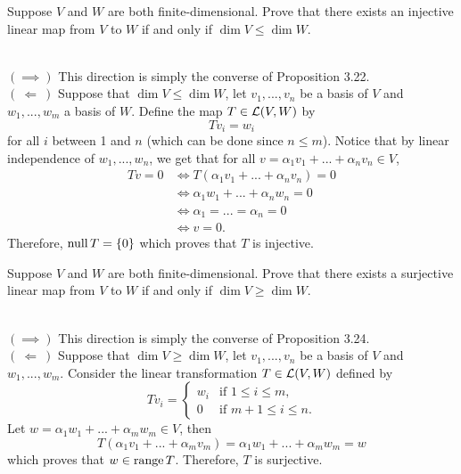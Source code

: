 \begin{exercise}
    Suppose $V$ and $W$ are both finite-dimensional. Prove that there exists an injective linear map from $V$ to $W$ if and only if $\dim V \leq \dim W$. \\
\end{exercise}

\begin{solution}
    \\ $(\implies)$ This direction is simply the converse of Proposition 3.22.\\
    $( \ \Longleftarrow \ )$ Suppose that $\dim V \leq \dim W$, let $v_1, ..., v_n$ be a basis of $V$ and $w_1, ..., w_m$ a basis of $W$. Define the map $T \in \mathcal{L}(V,W)$ by 
    $$Tv_i = w_i$$
    for all $i$ between 1 and $n$ (which can be done since $n \leq m$). Notice that by linear independence of $w_1, ..., w_n$, we get that for all $v = \alpha_1v_1 + ... + \alpha_n v_n \in V$,
    \begin{align*}
        Tv = 0 &\iff T(\alpha_1v_1 + ... + \alpha_n v_n) = 0 \\
        &\iff \alpha_1w_1 + ... + \alpha_n w_n = 0 \\
        &\iff \alpha_1 = ... = \alpha_n = 0 \\
        &\iff v = 0.
    \end{align*}
    Therefore, $\operatorname{\text{null}} T = \{0\}$ which proves that $T$ is injective.\\
\end{solution}

\begin{exercise}
    Suppose $V$ and $W$ are both finite-dimensional. Prove that there exists a surjective linear map from $V$ to $W$ if and only if $\dim V \geq \dim W$. \\
\end{exercise}

\begin{solution}
    \\ $(\implies)$ This direction is simply the converse of Proposition 3.24.\\
    $( \ \Longleftarrow \ )$ Suppose that $\dim V \geq \dim W$, let $v_1, ..., v_n$ be a basis of $V$ and $w_1, ..., w_m$. Consider the linear transformation $T \in \mathcal{L}(V,W)$ defined by
    $$Tv_i = \begin{cases} w_i & \text{if } 1 \leq i \leq m, \\ 0 & \text{if } m+1 \leq i \leq n. \end{cases}$$
    Let $w = \alpha_1w_1 + ... + \alpha_m w_m \in V$, then
    $$T(\alpha_1v_1 + ... + \alpha_m v_m) = \alpha_1w_1 + ... + \alpha_m w_m = w$$
    which proves that $w \in \operatorname{\text{range}} T$. Therefore, $T$ is surjective. \\
\end{solution}

